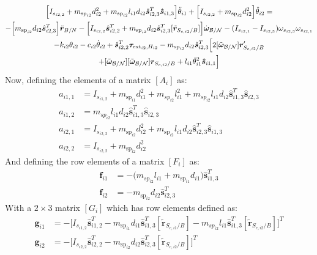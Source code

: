 \documentclass[paper]{aiaaNew}
\begin{document}
\begin{multline}
 \Big[I_{s_{i2,2}} + m_{\text{sp}_{i2}} d_{i2}^2 + m_{\text{sp}_{i2}} l_{i1} d_{i2} \hat{\bm s}_{i2,3}^T \bm{\hat{s}}_{i1,3} \Big] \ddot\theta_{i1} 
+ \Big[I_{s_{i2,2}} + m_{\text{sp}_{i2}} d_{i2}^2 \Big] \ddot\theta_{i2} 
= \\
-\Big[m_{\text{sp}_{i2}} d_{i2} \hat{\bm s}_{i2,3}^T\Big] \ddot{\bm{r}}_{B/N} - \Big[I_{s_{i2,2}} \hat{\bm s}_{i2,2}^T + m_{\text{sp}_{i2}} d_{i2} \hat{\bm s}_{i2,3}^T [\tilde{\bm{r}}_{S_{c,i2}/B}]\Big] \dot{\bm\omega}_{\cal B/N} - (I_{s_{i2,1}} - I_{s_{i2,3}}) \omega_{s_{i2,3}} \omega_{s_{i2,1}} \\
- k_{i2} \theta_{i2} - c_{i2} \dot{\theta}_{i2} + \hat{\bm s}_{i2,2}^T \bm \tau_{\text{ext}_{i2},H_{i2}}  
-  m_{\text{sp}_{i2}} d_{i2} \hat{\bm s}_{i2,3}^T \Big[ 2 [\tilde{\bm\omega}_{\cal B/N}] \bm{r}'_{S_{c,i2}/B} \\
+ [\tilde{\bm\omega}_{\cal B/N}] [\tilde{\bm\omega}_{\cal B/N}] \bm{r}_{S_{c,i2}/B} + l_{i1} \dot{\theta}_{i1}^2 \bm{\hat{s}}_{i1,1} \Big]
\label{eq:sp3final}
\end{multline}
Now, defining the elements of a matrix $[A_i]$ as:
\begin{subequations}
	\begin{align}
	a_{i1,1} &= I_{s_{i1,2}} + m_{\text{sp}_{i1}} d^2_{i1} + m_{sp_{i2}} l^2_{i1}+ m_{sp_{i2}} l_{i1} d_{i2}\hat{\bm s}^T_{i1,3}  \bm{\hat{s}}_{i2,3} \\
	a_{i1,2} &= m_{sp_{i2}} l_{i1} d_{i2} \hat{\bm s}^T_{i1,3}  \bm{\hat{s}}_{i2,3}\\
	a_{i2,1} &= I_{s_{i2,2}} + m_{\text{sp}_{i2}} d^2_{i2}  +  m_{\text{sp}_{i2}} l_{i1} d_{i2}\hat{\bm s}^T_{i2,3}  \bm{\hat{s}}_{i1,3} \\
	a_{i2,2} &= I_{s_{i2,2}} +  m_{\text{sp}_{i2}} d^2_{i2}
	\end{align}
\end{subequations}
And defining the row elements of a matrix $[F_i]$ as:
\begin{subequations}
	\begin{align}
	\bm f_{i1} &= -\big(m_{sp_{i2}} l_{i1} + m_{\text{sp}_{i1}} d_{i1} \big) \hat{\bm s}^T_{i1,3}\\
	\bm f_{i2} &= -m_{\text{sp}_{i2}} d_{i2} \hat{\bm s}_{i2,3}^T
	\end{align}
\end{subequations}
With a $2\times 3$ matrix $[G_i]$ which has row elements defined as:
\begin{subequations}
	\begin{align}
	\bm g_{i1} &= - \Big[I_{s_{i1,2}} \hat{\bm s}_{i1,2}^T - m_{\text{sp}_{i1}} d_{i1} \hat{\bm s}_{i1,3}^T [\tilde{\bm{r}}_{S_{c,i1}/B}] - m_{sp_{i2}} l_{i1} \hat{\bm s}_{i1,3}^T [\tilde{\bm{r}}_{S_{c,i2}/B}] \Big]^T\\
	\bm g_{i2} &= -  \Big[I_{s_{i2,2}} \hat{\bm s}_{i2,2}^T - m_{\text{sp}_{i2}} d_{i2} \hat{\bm s}_{i2,3}^T [\tilde{\bm{r}}_{S_{c,i2}/B}]\Big]^T
	\end{align}
\end{subequations}
\end{document}
